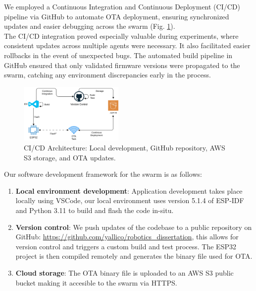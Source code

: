 \documentclass[conference]{IEEEtran}
\begin{document}
We employed a Continuous Integration and Continuous Deployment (CI/CD) pipeline via GitHub to automate OTA deployment, ensuring synchronized updates and easier debugging across the swarm (Fig. \ref{fig:cicd-architecture}).\\

The CI/CD integration proved especially valuable during experiments, where consistent updates across multiple agents were necessary. It also facilitated easier rollbacks in the event of unexpected bugs. The automated build pipeline in GitHub ensured that only validated firmware versions were propagated to the swarm, catching any environment discrepancies early in the process.\\

\begin{figure}[h]
    \centering
    \includegraphics[width=0.45\textwidth]{architecture.png}
    \caption{CI/CD Architecture: Local development, GitHub repository, AWS S3 storage, and OTA updates.}
    \label{fig:cicd-architecture}
\end{figure}

Our software development framework for the swarm is as follows:

\begin{enumerate}
    \item \textbf{Local environment development}: Application development takes place locally using VSCode, our local environment uses version 5.1.4 of ESP-IDF and Python 3.11 to build and flash the code in-situ.\\
    \item \textbf{Version control}: We push updates of the codebase to a public repository on GitHub: \url{https://github.com/yallico/robotics_dissertation}, this allows for version control and triggers a custom build and test process. The ESP32 project is then compiled remotely and generates the binary file used for OTA.\\
    \item \textbf{Cloud storage}: The OTA binary file is uploaded to an AWS S3 public bucket making it accesible to the swarm via HTTPS.\\
\end{enumerate}
\end{document}
